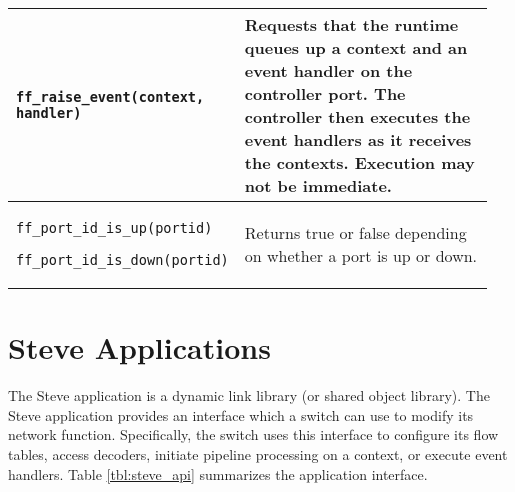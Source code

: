 \begin{table}
\begin{center}
\begin{tabular}{| p{0.4\linewidth} | p{0.55\linewidth} |}
\texttt{ff\_raise\_event(context, handler)} &
Requests that the runtime queues up a context and an event handler on the controller port. The controller then executes the event handlers as it receives the contexts. Execution may not be immediate. \\
\hline


\texttt{ff\_port\_id\_is\_up(portid)}

\texttt{ff\_port\_id\_is\_down(portid)} &

Returns true or false depending on whether a port is up or down. \\

\hline

\end{tabular}
\end{center}
\label{tbl:Freeflow_api}
\end{table}

\section{Steve Applications} \label{fp:app_interface}

The Steve application is a dynamic link library (or shared object library). The Steve application provides an interface which a switch can use to modify its network function.
Specifically, the switch uses this interface to configure its flow tables, access decoders, initiate pipeline processing on a context, or execute event handlers.
Table \ref{tbl:steve_api} summarizes the application interface.

